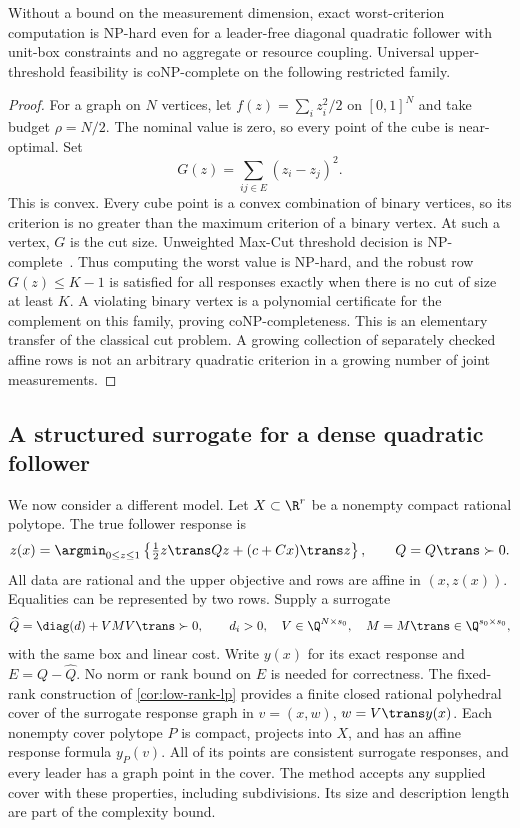 \begin{proposition}
\label{prop:robust-measurement-hardness}
Without a bound on the measurement dimension, exact worst-criterion
computation is NP-hard even for a leader-free diagonal quadratic
follower with unit-box constraints and no aggregate or resource
coupling. Universal upper-threshold feasibility is coNP-complete on
the following restricted family.
\end{proposition}
\begin{proof}
For a graph on $N$ vertices, let $f(z)=\sum_i z_i^2/2$ on $[0,1]^N$
and take budget $\rho=N/2$. The nominal value is zero, so every point
of the cube is near-optimal. Set
\[
                         G(z)=\sum_{ij\in E}(z_i-z_j)^2.
\]
This is convex. Every cube point is a convex combination of binary
vertices, so its criterion is no greater than the maximum criterion of
a binary vertex. At such a vertex, $G$ is the cut size. Unweighted
Max-Cut threshold decision is NP-complete~\cite{GareyJohnsonStockmeyer1976}.
Thus computing the worst value is NP-hard, and the robust row
$G(z)\le K-1$ is satisfied for all responses exactly when there is no
cut of size at least $K$. A violating binary vertex is a polynomial
certificate for the complement on this family, proving coNP-completeness.
This is an elementary transfer of the classical cut problem. A growing
collection of separately checked affine rows is not an arbitrary
quadratic criterion in a growing number of joint measurements.
\end{proof}

\subsection{A structured surrogate for a dense quadratic follower}
\label{subsec:screening-model}

We now consider a different model. Let $X\subset\R^r$ be a nonempty
compact rational polytope. The true follower response is
\begin{equation}\label{eq:dense-screening-follower}
 z(x)=\argmin_{0\le z\le1}
          \left\{\tfrac12 z\trans Qz+(c+Cx)\trans z\right\},
                      \qquad Q=Q\trans\succ0.
\end{equation}
All data are rational and the upper objective and rows are affine in
$(x,z(x))$. Equalities can be represented by two rows. Supply a surrogate
\[
 \widehat Q=\diag(d)+VMV\trans\succ0,\qquad
 d_i>0,\quad V\in\Q^{N\times s_0},\quad M=M\trans\in\Q^{s_0\times s_0},
\]
with the same box and linear cost. Write $y(x)$ for its exact response
and $E=Q-\widehat Q$. No norm or rank bound on $E$ is needed for
correctness. The fixed-rank construction of \cref{cor:low-rank-lp}
provides a finite closed rational polyhedral cover of the surrogate
response graph in $v=(x,w)$, $w=V\trans y(x)$. Each nonempty cover
polytope $P$ is compact, projects into $X$, and has an affine response
formula $y_P(v)$. All of its points are consistent surrogate responses,
and every leader has a graph point in the cover. The method accepts any
supplied cover with these properties, including subdivisions. Its size
and description length are part of the complexity bound.

